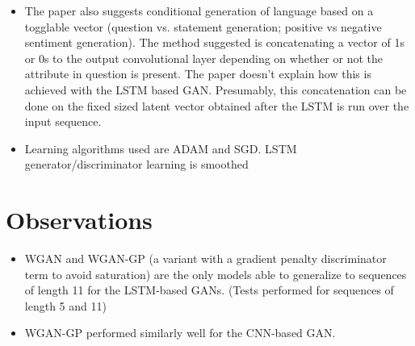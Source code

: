 \documentclass[12pt]{article}
\begin{document}
\begin{itemize}
    \item The paper also suggests conditional generation of language based on a togglable vector (question vs. statement generation; positive vs negative sentiment generation). The method suggested is concatenating a vector of 1s or 0s to the output convolutional layer depending on whether or not the attribute in question is present. The paper doesn't explain how this is achieved with the LSTM based GAN. Presumably, this concatenation can be done on the fixed sized latent vector obtained after the LSTM is run over the input sequence.
    \item Learning algorithms used are ADAM and SGD. LSTM generator/discriminator learning is smoothed
  \end{itemize}

\section{Observations}
  \begin{itemize}
    \item WGAN and WGAN-GP (a variant with a gradient penalty discriminator term to avoid saturation) are the only models able to generalize to sequences of length 11 for the LSTM-based GANs. (Tests performed for sequences of length 5 and 11)
    \item WGAN-GP performed similarly well for the CNN-based GAN.
  \end{itemize}



\end{document}
